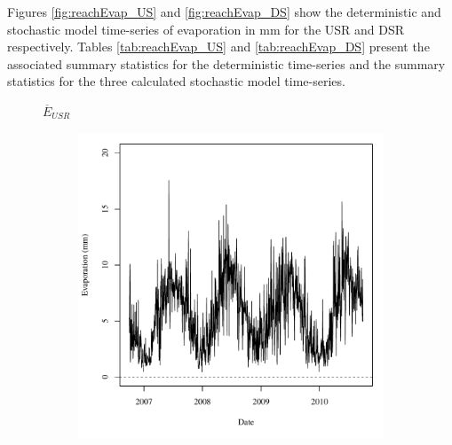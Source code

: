 Figures \ref{fig:reachEvap_US} and \ref{fig:reachEvap_DS} show the deterministic and stochastic model time-series of evaporation in \si{\milli\meter} for the USR and DSR respectively.  Tables \ref{tab:reachEvap_US} and \ref{tab:reachEvap_DS} present the associated summary statistics for the deterministic time-series and the summary statistics for the three calculated stochastic model time-series.

\subfiguretop
\begin{landscape}
	\begin{figure}
		\centering
		$ \displaystyle \overline{E}_{USR} $
		\begin{subfigure}{0.7\textwidth}
			\centering
			\includegraphics[width=\tableCustomSize]{"Figures/Results_USR/Deterministic/A Evap"}
		\end{subfigure}%
		\begin{subfigure}{0.7\textwidth}
			\centering

\end{subfigure}
\end{figure}
\end{landscape}
